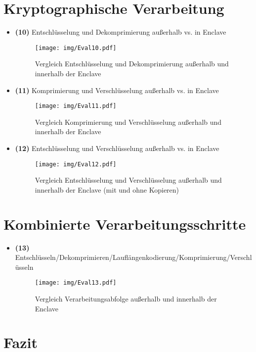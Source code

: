 \section{Kryptographische Verarbeitung}
\begin{itemize}
	
	\item \textbf{(10)} Entschlüsselung und Dekomprimierung außerhalb vs. in Enclave
	\begin{figure}[h]
		\texttt{[image: img/Eval10.pdf]}
		\centering
		\caption{Vergleich Entschlüsselung und Dekomprimierung außerhalb und innerhalb der Enclave}
		\label{fig:eval10}
	\end{figure}
	
	\item \textbf{(11)} Komprimierung und Verschlüsselung außerhalb vs. in Enclave
	\begin{figure}[h]
		\texttt{[image: img/Eval11.pdf]}
		\centering
		\caption{Vergleich Komprimierung und Verschlüsselung außerhalb und innerhalb der Enclave}
		\label{fig:eval11}
	\end{figure}
	
	\item \textbf{(12)} Entschlüsselung und Verschlüsselung außerhalb vs. in Enclave
	\begin{figure}[h]
		\texttt{[image: img/Eval12.pdf]}
		\centering
		\caption{Vergleich Entschlüsselung und Verschlüsselung außerhalb und innerhalb der Enclave (mit und ohne Kopieren)}
		\label{fig:eval12}
	\end{figure}
\end{itemize}
\section{Kombinierte Verarbeitungsschritte}

\begin{itemize}
	\item \textbf{(13)} Entschlüsseln/Dekomprimieren/Lauflängenkodierung/Komprimierung/Verschlüsseln
	\begin{figure}[h]
		\texttt{[image: img/Eval13.pdf]}
		\centering
		\caption{Vergleich Verarbeitungsabfolge außerhalb und innerhalb der Enclave}
		\label{fig:eval13}
	\end{figure}

\end{itemize}

\section{Fazit}
